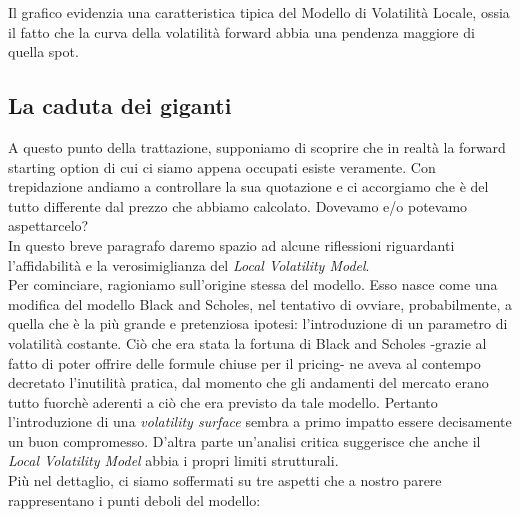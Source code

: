 \documentclass[11pt]{article}
\begin{document}
Il grafico evidenzia una caratteristica tipica del Modello di Volatilità Locale, ossia il fatto che la curva della volatilità forward abbia una pendenza maggiore di quella spot.

\subsection{La caduta dei giganti}

A questo punto della trattazione, supponiamo di scoprire che in realtà la forward starting option di cui ci siamo appena occupati esiste veramente. Con trepidazione andiamo a controllare la sua quotazione e ci accorgiamo che è del tutto differente dal prezzo che abbiamo calcolato. Dovevamo e/o potevamo aspettarcelo?\\

In questo breve paragrafo daremo spazio ad alcune riflessioni riguardanti l'affidabilità e la verosimiglianza del \textit{Local Volatility Model}.\\

Per cominciare, ragioniamo sull'origine stessa del modello. Esso nasce come una modifica del modello Black and Scholes, nel tentativo di ovviare, probabilmente, a quella che è la più grande e pretenziosa ipotesi: l'introduzione di un parametro di volatilità costante. Ciò che era stata la fortuna di Black and Scholes -grazie al fatto di poter offrire delle formule chiuse per il pricing- ne aveva al contempo decretato l'inutilità pratica, dal momento che gli andamenti del mercato erano tutto fuorchè aderenti a ciò che era previsto da tale modello. Pertanto l'introduzione di una \textit{volatility surface} sembra a primo impatto essere decisamente un buon compromesso. D'altra parte un'analisi critica suggerisce che anche il \textit{Local Volatility Model} abbia i propri limiti strutturali.\\

Più nel dettaglio, ci siamo soffermati su tre aspetti che a nostro parere rappresentano i punti deboli del modello:
\end{document}
